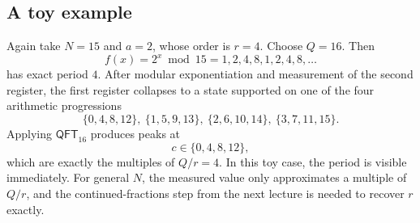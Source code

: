 \subsection{A toy example}

Again take $N=15$ and $a=2$, whose order is $r=4$. Choose $Q=16$. Then
\[
    f(x)=2^x \bmod 15
    =
    1,2,4,8,1,2,4,8,\dots
\]
has exact period $4$. After modular exponentiation and measurement of the second register, the first register collapses to a state supported on one of the four arithmetic progressions
\[
    \{0,4,8,12\},\ \{1,5,9,13\},\ \{2,6,10,14\},\ \{3,7,11,15\}.
\]
Applying $\mathsf{QFT}_{16}$ produces peaks at
\[
    c \in \{0,4,8,12\},
\]
which are exactly the multiples of $Q/r = 4$. In this toy case, the period is visible immediately. For general $N$, the measured value only approximates a multiple of $Q/r$, and the continued-fractions step from the next lecture is needed to recover $r$ exactly.















% 
% 
% 
